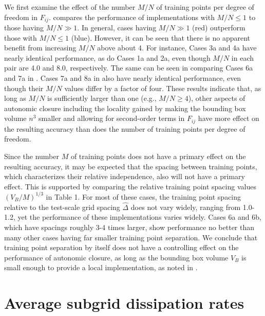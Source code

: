 We first examine the effect of the number  $M/N$ of training points per degree of freedom 
in $F_{ij}$.   compares the performance of implementations with $M/N \leq 1$  to those having $M/N \gg 1$. In general, cases having  $M/N \gg 1$ (red) outperform those with  $M/N \leq 1$ (blue). However, it can be seen that there is no apparent benefit from increasing $M/N$ above about 4. For instance, Cases 3a and 4a have nearly identical performance, as do Cases 1a and 2a, even though  $M/N$ in each pair are 4.0 and 8.0, respectively. The same can be seen in comparing Cases 6a and 7a in . Cases 7a and 8a in  also have nearly identical performance, even though their $M/N$ values differ by a factor of four. These results indicate that, as long as $M/N$  is sufficiently larger than one (e.g., $M/N \geq 4$), other aspects of autonomic closure including the locality gained by making the bounding box volume  $n^3$ smaller and allowing for second-order terms in $F_{ij}$  have more effect on the resulting accuracy than does the number of training points per degree of freedom.

Since the number $M$ of training points does not have a primary effect on the resulting accuracy, it may be expected that the spacing between training points, which characterizes their relative independence, also will not have a primary effect. This is supported by comparing the relative training point spacing values $(V_B/M)^{1/3}$ in Table 1. For most of these cases, the training point spacing relative to the test-scale grid spacing $\widehat{\Delta}$  does not vary widely, ranging from 1.0-1.2, yet the performance of these implementations varies widely. Cases 6a and 6b, which have spacings roughly 3-4 times larger, show performance no better than many other cases having far smaller training point separation. We conclude that training point separation by itself does not have a controlling effect on the performance of autonomic closure, as long as the bounding box volume  $V_B$ is small enough to provide a local implementation, as noted in .

\section{Average subgrid dissipation rates}
\label{sec:IVF}

